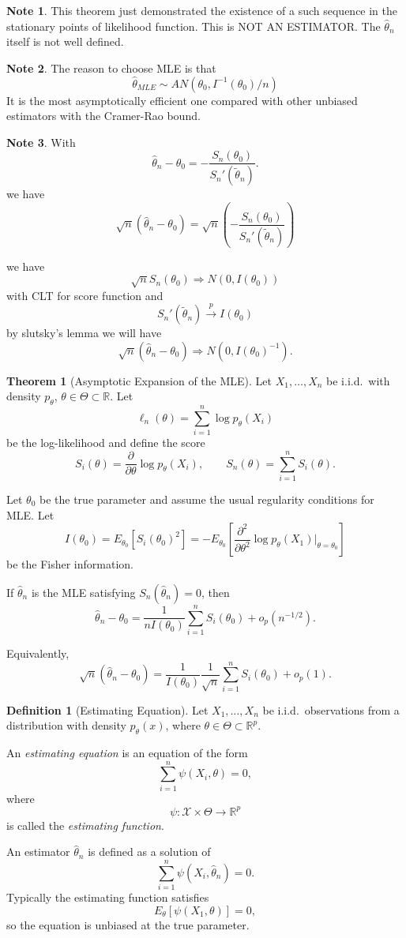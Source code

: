 \documentclass[11pt]{article}
\theoremstyle{definition}
\newtheorem{defn}{Definition}[section]
\newtheorem{note}{Note}[section]
\newtheorem{theo}{Theorem}[section]
\begin{document}
\begin{note}
    This theorem just demonstrated the existence of a such sequence in the stationary points of likelihood function. This is NOT AN ESTIMATOR. The $\hat{\theta}_n$ itself is not well defined.
\end{note}
\begin{note}
    The reason to choose MLE is that
    $$
    \hat{\theta}_{MLE} \sim AN(\theta_0, I^{-1}(\theta_0)/n)
    $$
    It is the most asymptotically efficient one compared with other unbiased estimators with the Cramer-Rao bound.
\end{note}
\begin{note}
    With
    \[
\hat\theta_n-\theta_0
=
-\frac{S_n(\theta_0)}{S_n'(\tilde\theta_n)}.
\]
we have 
\[
\sqrt{n}(\hat\theta_n-\theta_0)
=
\sqrt{n}(-\frac{S_n(\theta_0)}{S_n'(\tilde\theta_n)})
\]
\end{note}
we have 
$$
\sqrt{n} S_n\left(\theta_0\right) \Rightarrow N\left(0, I\left(\theta_0\right)\right)
$$
with CLT for score function and
$$
S_n'(\tilde\theta_n)\xrightarrow{p}I(\theta_0)
$$
by slutsky's lemma we will have 
\[
\sqrt{n}(\hat\theta_n-\theta_0)
\Rightarrow
N\!\left(0, I(\theta_0)^{-1}\right).
\]
\begin{theo}[Asymptotic Expansion of the MLE]
Let $X_1,\dots,X_n$ be i.i.d.\ with density $p_\theta$, $\theta \in \Theta \subset \mathbb{R}$.
Let
\[
\ell_n(\theta) = \sum_{i=1}^n \log p_\theta(X_i)
\]
be the log-likelihood and define the score
\[
S_i(\theta) = \frac{\partial}{\partial \theta}\log p_\theta(X_i),
\qquad
S_n(\theta) = \sum_{i=1}^n S_i(\theta).
\]

Let $\theta_0$ be the true parameter and assume the usual regularity conditions for MLE.
Let
\[
I(\theta_0)
=
E_{\theta_0}\!\left[S_i(\theta_0)^2\right]
=
- E_{\theta_0}\!\left[\frac{\partial^2}{\partial \theta^2}\log p_\theta(X_1)\Big|_{\theta=\theta_0}\right]
\]
be the Fisher information.

If $\hat\theta_n$ is the MLE satisfying $S_n(\hat\theta_n)=0$, then
\[
\hat\theta_n - \theta_0
=
\frac{1}{n I(\theta_0)}
\sum_{i=1}^n S_i(\theta_0)
+
o_p(n^{-1/2}).
\]

Equivalently,
\[
\sqrt n(\hat\theta_n-\theta_0)
=
\frac{1}{I(\theta_0)}
\frac{1}{\sqrt n}\sum_{i=1}^n S_i(\theta_0)
+
o_p(1).
\]
\end{theo}
\begin{defn}[Estimating Equation]
Let $X_1,\dots,X_n$ be i.i.d.\ observations from a distribution with density
$p_\theta(x)$, where $\theta \in \Theta \subset \mathbb{R}^p$.

An \emph{estimating equation} is an equation of the form
\[
\sum_{i=1}^{n} \psi(X_i,\theta)=0,
\]
where
\[
\psi:\mathcal X \times \Theta \to \mathbb R^p
\]
is called the \emph{estimating function}.

An estimator $\hat\theta_n$ is defined as a solution of
\[
\sum_{i=1}^{n} \psi(X_i,\hat\theta_n)=0.
\]
Typically the estimating function satisfies
\[
E_\theta[\psi(X_1,\theta)]=0,
\]
so the equation is unbiased at the true parameter.
\end{defn}
\end{document}
